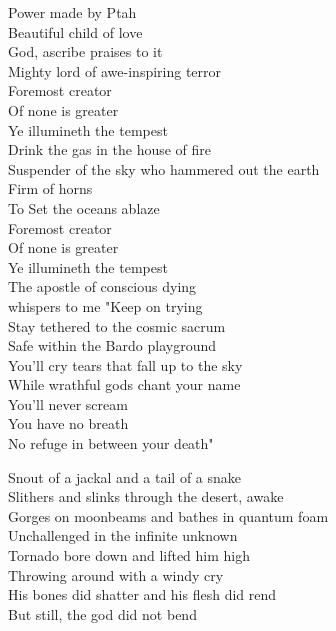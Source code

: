 
Power made by Ptah\\
Beautiful child of love\\
God, ascribe praises to it\\
Mighty lord of awe-inspiring terror\\
Foremost creator\\
Of none is greater\\
Ye illumineth the tempest\\

Drink the gas in the house of fire\\
Suspender of the sky who hammered out the earth\\
Firm of horns\\
To Set the oceans ablaze\\
Foremost creator\\
Of none is greater\\
Ye illumineth the tempest\\

The apostle of conscious dying\\
whispers to me "Keep on trying\\
Stay tethered to the cosmic sacrum\\
Safe within the Bardo playground\\
You'll cry tears that fall up to the sky\\
While wrathful gods chant your name\\
You'll never scream\\
You have no breath\\
No refuge in between your death"\\



Snout of a jackal and a tail of a snake\\
Slithers and slinks through the desert, awake\\
Gorges on moonbeams and bathes in quantum foam\\
Unchallenged in the infinite unknown\\

Tornado bore down and lifted him high\\
Throwing  around with a windy cry\\
His bones did shatter and his flesh did rend\\
But still, the god did not bend\\

